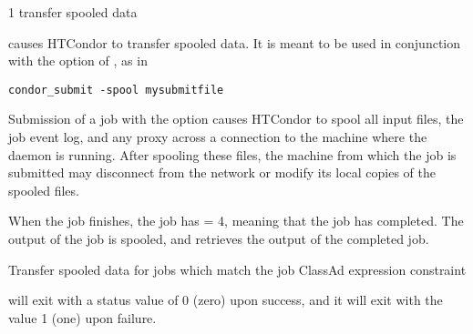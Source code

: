 \begin{ManPage}{\label{man-condor-transfer-data}}{1}
{transfer spooled data}

\Synopsis {}
\ToolArgsBase

\ToolLocate
\ToolJobs
\Bar{}  \Dots

\ToolLocate
\ToolAll

\Description
{} causes HTCondor to transfer spooled
data.
It is meant to be used in conjunction with the 
option of , as in
\footnotesize
\begin{verbatim}
condor_submit -spool mysubmitfile
\end{verbatim}
\normalsize
Submission of a job with the  option causes HTCondor
to spool all input files, the job event log, and any proxy across
a connection to the machine where the  daemon
is running.
After spooling these files,
the machine from which the job is submitted may
disconnect from the network
or modify its local copies of the spooled files.

When the job finishes,
the job has  = 4, meaning that the job has
completed.
The output of the job is spooled,
and
 retrieves the output of the completed
job.



\begin{Options}
  \ToolArgsBaseDesc
  \ToolLocateDesc
   {Transfer spooled data for
  jobs which match the job ClassAd expression constraint}
\end{Options}

\ExitStatus

 will exit with a status value of 0 (zero) upon success,
and it will exit with the value 1 (one) upon failure.

\end{ManPage}
